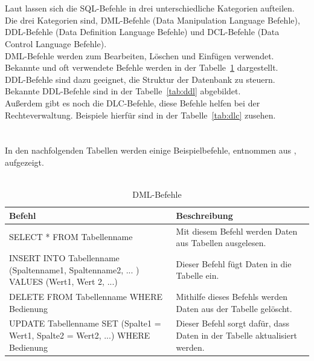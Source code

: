 \\
\\
Laut \cite{Lub17} lassen sich die SQL-Befehle in drei unterschiedliche Kategorien aufteilen.
Die drei Kategorien sind, DML-Befehle (Data Manipulation Language Befehle), DDL-Befehle (Data Definition Language Befehle) und DCL-Befehle (Data Control Language Befehle).
\\
DML-Befehle werden zum Bearbeiten, Löschen und Einfügen verwendet. Bekannte und oft verwendete Befehle werden in der Tabelle~\ref{tab:dml} dargestellt.
\\
DDL-Befehle sind dazu geeignet, die Struktur der Datenbank zu steuern.
Bekannte DDL-Befehle sind in der Tabelle~\ref{tab:ddl} abgebildet.
\\
Außerdem gibt es noch die DLC-Befehle, diese Befehle helfen bei der Rechteverwaltung. Beispiele hierfür sind in der Tabelle~\ref{tab:dlc} zusehen. 
\\
\\
\\
In den nachfolgenden Tabellen werden einige Beispielbefehle, entnommen aus \cite{w3SQL}, aufgezeigt.
\\
\\
\begin{table}[h]
	\begin{tabular}{|p{7cm}|p{7cm}|}
		\hline
		\textbf{Befehl} & \textbf{Beschreibung} \\
		\hline
		SELECT * FROM Tabellenname & Mit diesem Befehl werden Daten aus Tabellen ausgelesen. \\
		\hline
		INSERT INTO Tabellenname (Spaltenname1, Spaltenname2, ... ) VALUES (Wert1, Wert 2, ...)	 & Dieser Befehl fügt Daten in die Tabelle ein. \\
		\hline
		DELETE FROM Tabellenname WHERE Bedienung & Mithilfe dieses Befehls werden Daten aus der Tabelle gelöscht. \\
		\hline
		UPDATE Tabellenname SET (Spalte1 = Wert1, Spalte2 = Wert2, ...) WHERE Bedienung  & Dieser Befehl sorgt dafür, dass Daten in der Tabelle aktualisiert werden. \\
		\hline
	\end{tabular}
	\caption{DML-Befehle}
	\label{tab:dml}
\end{table}
\\  

